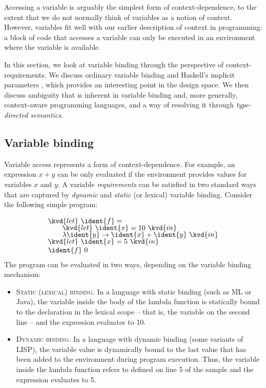 Accessing a variable is arguably the simplest form of context-dependence, to the extent that we
do not normally think of variables as a notion of context. However, variables fit well with our
earlier description of context in programming: a block of code that accesses a variable can only
be executed in an environment where the variable is available.

In this section, we look at variable binding through the perspective of context-requirements.
We discuss ordinary variable binding and Haskell's implicit parameters \cite{app-implicit-parameters},
which provides an interesting point in the design space. We then discuss ambiguity that is inherent
in variable binding and, more generally, context-aware programming languages, and a way of
resolving it through \emph{type-directed semantics}.


\subsection{Variable binding}
\label{sec:path-binding-var}

Variable access represents a form of context-dependence. For example, an expression $x+y$ can be
only evaluated if the environment provides values for variables $x$ and $y$. A variable
\emph{requirements} can be satisfied in two standard ways that are captured by \emph{dynamic} and
\emph{static} (or lexical) variable binding. Consider the following simple program:

\begin{equation*}
\begin{array}{l}
\kvd{let}~\ident{f}=\\[-0.25em]
\qquad\kvd{let}~\ident{x}=10~\kvd{in}\\[-0.25em]
\qquad\lambda \ident{y}\rightarrow \ident{x}+\ident{y}~\kvd{in}\\[-0.25em]
\kvd{let}~\ident{x}=5~\kvd{in}\\
\ident{f}~0
\end{array}
\end{equation*}
%
The program can be evaluated in two ways, depending on the variable binding mechanism:
%
\begin{itemize}
\item \textsc{Static (lexical) binding.} In a language with static binding (such as ML or Java),
  the variable  inside the body of the lambda function is statically bound to the
  declaration in the lexical scope -- that is, the variable on the second line -- and the
  expression evaluates to 10.

\item \textsc{Dynamic binding.} In a language with dynamic binding (some variants of LISP), the
  variable value is dynamically bound to the last value that has been added to the environment
  during program execution. Thus, the  variable inside the lambda function refers to
   defined on line 5 of the sample and the expression evaluates to 5.
\end{itemize}

